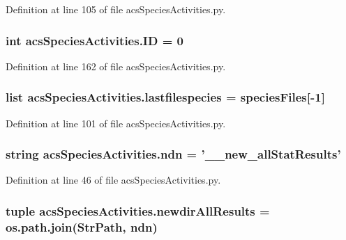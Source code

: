 Definition at line 105 of file acs\-Species\-Activities.\-py.

\hypertarget{a00097_a8102909ea2c113190493bd581f17ba18}{
\subsubsection[{I\-D}]{\setlength{\rightskip}{0pt plus 5cm}int acs\-Species\-Activities.\-I\-D = 0}}\label{a00097_a8102909ea2c113190493bd581f17ba18}


Definition at line 162 of file acs\-Species\-Activities.\-py.

\hypertarget{a00097_ac7070acb2aaeb8965c57e81b6308ddd5}{
\subsubsection[{lastfilespecies}]{\setlength{\rightskip}{0pt plus 5cm}list acs\-Species\-Activities.\-lastfilespecies = {\bf species\-Files}\mbox{[}-\/1\mbox{]}}}\label{a00097_ac7070acb2aaeb8965c57e81b6308ddd5}


Definition at line 101 of file acs\-Species\-Activities.\-py.

\hypertarget{a00097_ad2a87ed28d0f42525ce49c390f390298}{
\subsubsection[{ndn}]{\setlength{\rightskip}{0pt plus 5cm}string acs\-Species\-Activities.\-ndn = '\-\_\-\_\-new\-\_\-all\-Stat\-Results'}}\label{a00097_ad2a87ed28d0f42525ce49c390f390298}


Definition at line 46 of file acs\-Species\-Activities.\-py.

\hypertarget{a00097_a4fc28291b7f61ee2fa8969fa7a690ba2}{
\subsubsection[{newdir\-All\-Results}]{\setlength{\rightskip}{0pt plus 5cm}tuple acs\-Species\-Activities.\-newdir\-All\-Results = os.\-path.\-join({\bf Str\-Path}, {\bf ndn})}}\label{a00097_a4fc28291b7f61ee2fa8969fa7a690ba2}


